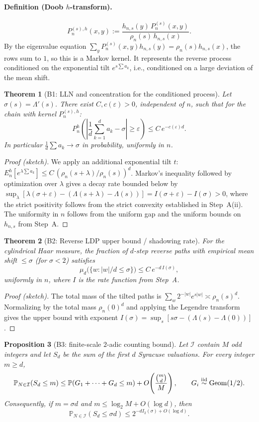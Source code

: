\documentclass[12pt,a4paper]{article}
\newtheorem{theorem}{Theorem}[section]
\newtheorem{proposition}[theorem]{Proposition}
\theoremstyle{remark}
\begin{document}
\paragraph{Definition (Doob $h$-transform).}
\[
P_n^{(s),h}(x,y):=\frac{h_{n,s}(y)\,P_n^{(s)}(x,y)}{\rho_n(s)\,h_{n,s}(x)}.
\]
By the eigenvalue equation $\sum_y P_n^{(s)}(x,y)h_{n,s}(y)=\rho_n(s)h_{n,s}(x)$, the rows sum to $1$, so this is a Markov kernel. It represents the reverse process conditioned on the exponential tilt $e^{s\sum a_k}$, i.e., conditioned on a large deviation of the mean shift.
\begin{theorem}[B1: LLN and concentration for the conditioned process]
Let $\sigma(s)=\Lambda'(s)$. There exist $C,c(\varepsilon)>0$, independent of $n$, such that for the chain with kernel $P_n^{(s),h}$:
\[
P_n^{h}\left(\left|\frac1d\sum_{k=1}^d a_k-\sigma\right|\ge\varepsilon\right)\le C\,e^{-c(\varepsilon)d}.
\]
In particular $\frac1d\sum a_k\to\sigma$ in probability, uniformly in $n$.
\end{theorem}
\begin{proof}[Proof (sketch)]
We apply an additional exponential tilt $t$: $E_n^{h}[e^{\lambda\sum a_k}]\le C\,(\rho_n(s+\lambda)/\rho_n(s))^d$. Markov's inequality followed by optimization over $\lambda$ gives a decay rate bounded below by $\sup_\lambda[\lambda(\sigma+\varepsilon)-(\Lambda(s+\lambda)-\Lambda(s))]=I(\sigma+\varepsilon)-I(\sigma)>0$, where the strict positivity follows from the strict convexity established in Step~A(ii). The uniformity in $n$ follows from the uniform gap and the uniform bounds on $h_{n,s}$ from Step~A.
\end{proof}
\begin{theorem}[B2: Reverse LDP upper bound / shadowing rate]
For the cylindrical Haar measure, the fraction of $d$-step reverse paths with empirical mean shift $\le\sigma$ (for $\sigma<2$) satisfies
\[
\mu_d\big(\{w : |w|/d\le\sigma\}\big)\le C\,e^{-d\,I(\sigma)},
\]
uniformly in $n$, where $I$ is the rate function from Step~A.
\end{theorem}
\begin{proof}[Proof (sketch)]
The total mass of the tilted paths is $\sum_{w}2^{-|w|}e^{s|w|}\asymp\rho_n(s)^d$. Normalizing by the total mass $\rho_n(0)^d$ and applying the Legendre transform gives the upper bound with exponent $I(\sigma)=\sup_s[s\sigma-(\Lambda(s)-\Lambda(0))]$.
\end{proof}
\begin{proposition}[B3: finite-scale $2$-adic counting bound]
\label{prop:finite_scale_2adic}
Let $\mathcal I$ contain $M$ odd integers and let $S_d$ be the sum of the
first $d$ Syracuse valuations.  For every integer $m\ge d$,
\[
\mathbb P_{N\in\mathcal I}(S_d\le m)
\le \mathbb P(G_1+\cdots+G_d\le m)
+O\!\left(\frac{\binom md}{M}\right),
\qquad G_i\stackrel{\rm iid}{\sim}{\rm Geom}(1/2).
\]
Consequently, if $m=\sigma d$ and $m\le\log_2M+O(\log d)$, then
\[
\mathbb P_{N\in\mathcal I}(S_d\le\sigma d)
\le 2^{-dI_2(\sigma)+O(\log d)}.
\]
\end{proposition}
\end{document}
